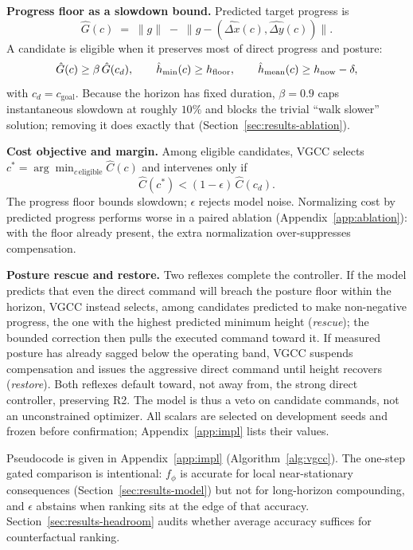 \documentclass{article}
\begin{document}
\textbf{Progress floor as a slowdown bound.}
Predicted target progress is
\begin{equation}
\hat{G}(c) \;=\; \lVert g \rVert \;-\; \bigl\lVert g - (\widehat{\Delta x}(c), \widehat{\Delta y}(c)) \bigr\rVert .
\end{equation}
A candidate is eligible when it preserves most of direct progress and posture:
\begin{equation}
\hat G(c)\ge\beta\,\hat G(c_d),\qquad
\hat h_{\min}(c)\ge h_{\rm floor},\qquad
\hat h_{\rm mean}(c)\ge h_{\rm now}-\delta,
\label{eq:vgc-eligible}
\end{equation}
with $c_d=c_{\text{goal}}$. Because the horizon has fixed duration, $\beta=0.9$
caps instantaneous slowdown at roughly $10\%$ and blocks the trivial ``walk
slower'' solution; removing it does exactly that
(Section~\ref{sec:results-ablation}).

\textbf{Cost objective and margin.}
Among eligible candidates, VGCC selects
$c^\ast=\arg\min_{c\,\text{eligible}}\hat C(c)$ and intervenes only if
\begin{equation}
\hat C(c^\ast) < (1-\epsilon)\,\hat C(c_d).
\label{eq:vgc-cost}
\end{equation}
The progress floor bounds slowdown; $\epsilon$ rejects model noise. Normalizing
cost by predicted progress performs worse in a paired ablation
(Appendix~\ref{app:ablation}): with the floor already present, the extra
normalization over-suppresses compensation.

\textbf{Posture rescue and restore.}
Two reflexes complete the controller. If the model predicts that even the direct
command will breach the posture floor within the horizon, VGCC instead selects,
among candidates predicted to make non-negative progress, the one with the
highest predicted minimum height (\emph{rescue}); the bounded correction then
pulls the executed command toward it. If measured posture has already sagged
below the operating band, VGCC suspends compensation and issues the aggressive
direct command until height recovers (\emph{restore}). Both reflexes default
toward, not away from, the strong direct controller, preserving R2. The model is
thus a veto on candidate commands, not an unconstrained optimizer. All scalars
are selected on development seeds and frozen before confirmation;
Appendix~\ref{app:impl} lists their values.

Pseudocode is given in Appendix~\ref{app:impl} (Algorithm~\ref{alg:vgcc}). The one-step gated comparison is intentional: $f_\phi$ is accurate for local near-stationary consequences (Section~\ref{sec:results-model}) but not for long-horizon compounding, and $\epsilon$ abstains when ranking sits at the edge of that accuracy. Section~\ref{sec:results-headroom} audits whether average accuracy suffices for counterfactual ranking.
\end{document}
